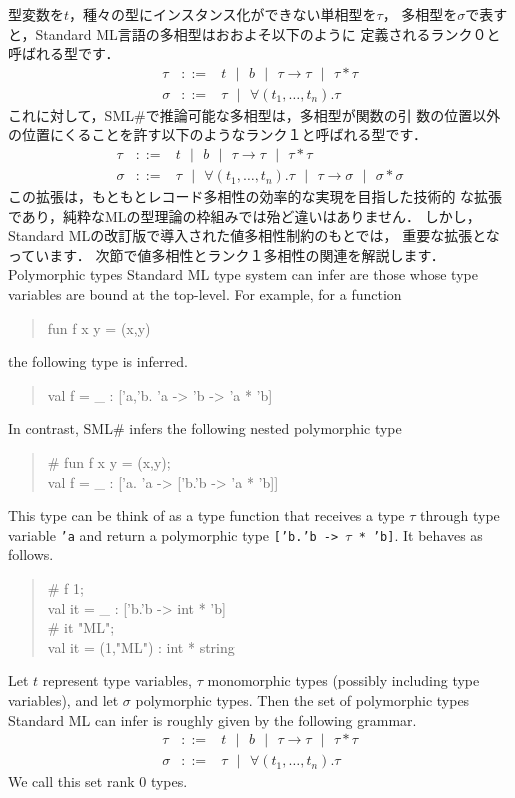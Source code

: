 \documentclass{jbook}
\newcommand{\smlsharp}{SML\#}
\newcommand{\func}{\rightarrow}
\newcommand{\vbar}{\mbox{\ $|$\ }}
\newenvironment{program}{\begin{quote}\begin{tt}}%
                        {\end{tt}\end{quote}}
\begin{document}
	型変数を$t$，種々の型にインスタンス化ができない単相型を$\tau$，
多相型を$\sigma$で表すと，Standard ML言語の多相型はおおよそ以下のように
定義されるランク０と呼ばれる型です．
\begin{eqnarray*}
\tau &::=& t \vbar b \vbar \tau \func \tau \vbar \tau * \tau
\\
\sigma &::=& \tau \vbar \forall (t_1,\ldots,t_n).\tau
\end{eqnarray*}
	これに対して，\smlsharp{}で推論可能な多相型は，多相型が関数の引
数の位置以外の位置にくることを許す以下のようなランク１と呼ばれる型です．
\begin{eqnarray*}
\tau &::=& t \vbar b \vbar \tau \func \tau \vbar \tau * \tau
\\
\sigma &::=& \tau \vbar \forall (t_1,\ldots,t_n).\tau 
\vbar \tau \func \sigma
\vbar \sigma * \sigma 
\end{eqnarray*}
	この拡張は，もともとレコード多相性の効率的な実現を目指した技術的
な拡張であり，純粋なMLの型理論の枠組みでは殆ど違いはありません．
	しかし，Standard MLの改訂版で導入された値多相性制約のもとでは，
重要な拡張となっています．
	次節で値多相性とランク１多相性の関連を解説します．
\else%
	Polymorphic types Standard ML type system can infer are those
whose type variables are bound at the top-level.
	For example, for a function
\begin{program}
fun f x y = (x,y)
\end{program}
the following type is inferred.
\begin{program}
val f = \_ : ['a,'b. 'a -> 'b -> 'a * 'b]
\end{program}
	In contrast, \smlsharp{} infers the following nested
polymorphic type
\begin{program}
\# fun f x y = (x,y);\\
val f = \_ : ['a. 'a -> ['b.'b -> 'a * 'b]]
\end{program}
	This type can be think of as a type function that receives a
type $\tau$ through type variable {\tt 'a} and return a polymorphic type
{\tt ['b.'b -> $\tau$ * 'b]}.
	It behaves as follows.
\begin{program}
\# f 1;\\
val it = \_ : ['b.'b -> int * 'b]\\
\# it "ML";\\
val it = (1,"ML") : int * string
\end{program}

	Let $t$ represent type variables,
$\tau$ monomorphic types (possibly including type variables), and let
$\sigma$ polymorphic types.
	Then the set of polymorphic types Standard ML can infer is
roughly given by the following grammar. 
\begin{eqnarray*}
\tau &::=& t \vbar b \vbar \tau \func \tau \vbar \tau * \tau
\\
\sigma &::=& \tau \vbar \forall (t_1,\ldots,t_n).\tau
\end{eqnarray*}
	We call this set rank 0 types.
\end{document}
